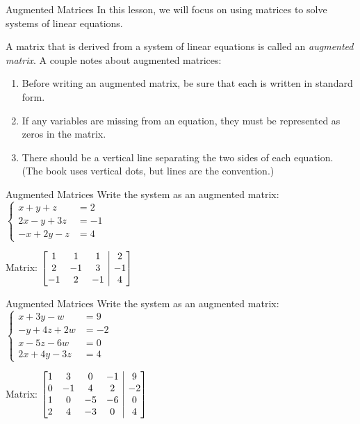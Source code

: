 \documentclass[t, aspectratio=169]{beamer}
\makeatletter
\newenvironment{amatrix}[1]{%
	\left[\begin{array}{@{}*{#1}{c}|c@{}}
	}{%
	\end{array}\right]
}
\makeatother
\begin{document}
	\begin{frame}{Augmented Matrices}
		In this lesson, we will focus on using matrices to solve systems of linear equations. \pause
		
		A matrix that is derived from a system of linear equations is called an \textit{augmented matrix}. A couple notes about augmented matrices: \pause \begin{enumerate}[1)]
			\item Before writing an augmented matrix, be sure that each is written in standard form.
			\item If any variables are missing from an equation, they must be represented as zeros in the matrix.
			\item There should be a vertical line separating the two sides of each equation. (The book uses vertical dots, but lines are the convention.)
		\end{enumerate}
	\end{frame}

	\begin{frame}{Augmented Matrices}
		Write the system as an augmented matrix: $\begin{cases}
		x + y + z &= 2 \\ 2x - y + 3z &= -1 \\ -x + 2y - z &= 4
		\end{cases}$ \pause \vspace{24pt}
		
		Matrix: $\begin{amatrix}{3}
		1 & 1 & 1 & 2 \\ 2 & -1 & 3 & -1 \\ -1 & 2 & -1 & 4
		\end{amatrix}$
	\end{frame}

	\begin{frame}{Augmented Matrices}
		Write the system as an augmented matrix: $\begin{cases}
		x + 3y - w &= 9 \\ -y + 4z + 2w &= -2 \\ x - 5z - 6w &= 0 \\ 2x + 4y - 3z &= 4
		\end{cases}$ \pause \vspace{24pt}
		
		Matrix: $\begin{amatrix}{4}
		1 & 3 & 0 & -1 & 9 \\ 0 & -1 & 4 & 2 & -2 \\ 1 & 0 & -5 & -6 & 0 \\ 2 & 4 & -3 & 0 & 4
		\end{amatrix}$
	\end{frame}
\end{document}
